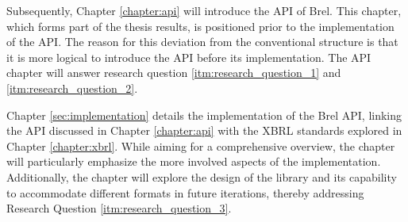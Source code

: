Subsequently, Chapter \ref{chapter:api} will introduce the API of Brel.
This chapter, which forms part of the thesis results, is positioned prior to the implementation of the API.
The reason for this deviation from the conventional structure is that it is more logical to introduce the API before its implementation.
The API chapter will answer research question \ref{itm:research_question_1} and \ref{itm:research_question_2}.

Chapter \ref{sec:implementation} details the implementation of the Brel API, 
linking the API discussed in Chapter \ref{chapter:api} with the XBRL standards explored in Chapter \ref{chapter:xbrl}.
While aiming for a comprehensive overview,
the chapter will particularly emphasize the more involved aspects of the implementation.
Additionally, the chapter will explore the design of the library and its capability to accommodate different formats in future iterations, 
thereby addressing Research Question \ref{itm:research_question_3}.

